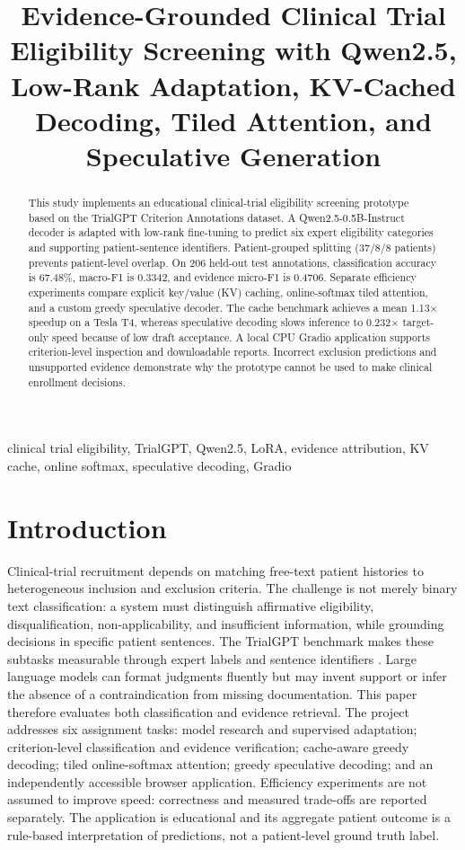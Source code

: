 \documentclass[conference]{IEEEtran}
\title{Evidence-Grounded Clinical Trial Eligibility Screening with Qwen2.5, Low-Rank Adaptation, KV-Cached Decoding, Tiled Attention, and Speculative Generation}
\author{\IEEEauthorblockN{Fatima Shakir (23I-0503)}\IEEEauthorblockA{School of Computing, FAST National University of Computer and Emerging Sciences\\Islamabad Campus, Pakistan}}
\begin{document}
\maketitle
\begin{abstract}
This study implements an educational clinical-trial eligibility screening prototype based on the TrialGPT Criterion Annotations dataset. A Qwen2.5-0.5B-Instruct decoder is adapted with low-rank fine-tuning to predict six expert eligibility categories and supporting patient-sentence identifiers. Patient-grouped splitting (37/8/8 patients) prevents patient-level overlap. On 206 held-out test annotations, classification accuracy is 67.48\%, macro-F1 is 0.3342, and evidence micro-F1 is 0.4706. Separate efficiency experiments compare explicit key/value (KV) caching, online-softmax tiled attention, and a custom greedy speculative decoder. The cache benchmark achieves a mean 1.13$\times$ speedup on a Tesla T4, whereas speculative decoding slows inference to 0.232$\times$ target-only speed because of low draft acceptance. A local CPU Gradio application supports criterion-level inspection and downloadable reports. Incorrect exclusion predictions and unsupported evidence demonstrate why the prototype cannot be used to make clinical enrollment decisions.
\end{abstract}
\begin{IEEEkeywords}clinical trial eligibility, TrialGPT, Qwen2.5, LoRA, evidence attribution, KV cache, online softmax, speculative decoding, Gradio\end{IEEEkeywords}
\section{Introduction}
Clinical-trial recruitment depends on matching free-text patient histories to heterogeneous inclusion and exclusion criteria. The challenge is not merely binary text classification: a system must distinguish affirmative eligibility, disqualification, non-applicability, and insufficient information, while grounding decisions in specific patient sentences. The TrialGPT benchmark makes these subtasks measurable through expert labels and sentence identifiers \cite{trialgpt}. Large language models can format judgments fluently but may invent support or infer the absence of a contraindication from missing documentation. This paper therefore evaluates both classification and evidence retrieval.
The project addresses six assignment tasks: model research and supervised adaptation; criterion-level classification and evidence verification; cache-aware greedy decoding; tiled online-softmax attention; greedy speculative decoding; and an independently accessible browser application. Efficiency experiments are not assumed to improve speed: correctness and measured trade-offs are reported separately. The application is educational and its aggregate patient outcome is a rule-based interpretation of predictions, not a patient-level ground truth label.
\end{document}
